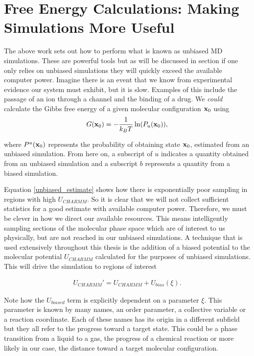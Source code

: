 \section{Free Energy Calculations: Making Simulations More Useful}
The above work sets out how to perform what is known as unbiased MD simulations. These are powerful tools but as will be discussed in section  if one only relies on unbiased simulations they will quickly exceed the available computer power. Imagine there is an event that we know from experimental evidence our system must exhibit, but it is slow. Examples of this include the passage of an ion through a channel and the binding of a drug. We \textit{could} calculate the Gibbs free energy of a given molecular configuration $\bold{x}_0$ using 
\begin{equation}
	G (\bold{x}_0) = -\frac{1}{k_BT}\ln(P_{u}(\bold{x}_0)),
	\label{unbiased_estimate}
\end{equation}

where $P^u(\bold{x}_0)$ represents the probability of obtaining state $\bold{x}_0$, estimated from an unbiased simulation. From here on, a subscript of $u$ indicates a quantity obtained from an unbiased simulation and a subscript $b$ represents a quantity from a biased simulation. 

Equation \ref{unbiased_estimate} shows how there is exponentially poor sampling in regions with high $U_{CHARMM}$. So it is clear that we will not collect sufficient statistics for a good estimate with available computer power. Therefore, we must be clever in how we direct our available resources. This means intelligently sampling sections of the molecular phase space which are of interest to us physically, but are not reached in our unbiased simulations. A technique that is used extensively throughout this thesis is the addition of a biased potential to the molecular potential $U_{CHARMM}$ calculated for the purposes of unbiased simulations. This will drive the simulation to regions of interest

\begin{equation}
\begin{aligned}
U_{CHARMM}'  = U_{CHARMM} + U_{bias} (\xi).
\end{aligned}
\end{equation}

Note how the $U_{biased}$ term is explicitly dependent on a parameter $\xi$. This parameter is known by many names, an order parameter, a collective variable or a reaction coordinate. Each of these names has its origin in a different subfield but they all refer to the progress toward a target state. This could be a phase transition from a liquid to a gas, the progress of a chemical reaction or more likely in our case, the distance toward a target molecular configuration. 

